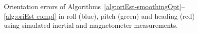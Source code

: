 \begin{figure}
{		}
  \caption{Orientation errors of Algorithms~\ref{alg:oriEst-smoothingOpt}--\ref{alg:oriEst-compl} in roll (blue), pitch (green) and heading (red) using simulated inertial and magnetometer measurements.}
  \label{fig:oriEst-oriSimResultsEstAll}
\end{figure}

